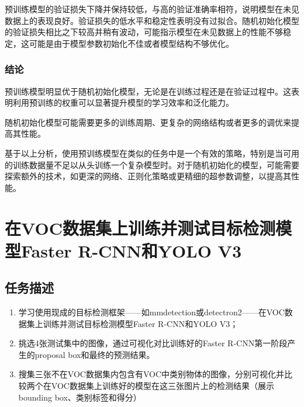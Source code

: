 \documentclass[notitlepage,cs4size,punct,oneside]{ctexrep}
\numberwithin{equation}{chapter}
\theoremstyle{mystyle}
\begin{document}
预训练模型的验证损失下降并保持较低，与高的验证准确率相符，说明模型在未见数据上的表现良好。验证损失的低水平和稳定性表明没有过拟合。随机初始化模型的验证损失相比之下较高并稍有波动，可能指示模型在未见数据上的性能不够稳定，这可能是由于模型参数初始化不佳或者模型结构不够优化。

\subsection{结论}
预训练模型明显优于随机初始化模型，无论是在训练过程还是在验证过程中。这表明利用预训练的权重可以显著提升模型的学习效率和泛化能力。

随机初始化模型可能需要更多的训练周期、更复杂的网络结构或者更多的调优来提高其性能。

基于以上分析，使用预训练模型在类似的任务中是一个有效的策略，特别是当可用的训练数据量不足以从头训练一个复杂模型时。对于随机初始化的模型，可能需要探索额外的技术，如更深的网络、正则化策略或更精细的超参数调整，以提高其性能。



\chapter{在VOC数据集上训练并测试目标检测模型Faster R-CNN和YOLO V3}
\section{任务描述}
\begin{enumerate}
    \item 学习使用现成的目标检测框架——如mmdetection或detectron2——在VOC数据集上训练并测试目标检测模型Faster R-CNN和YOLO V3；
    \item 挑选4张测试集中的图像，通过可视化对比训练好的Faster R-CNN第一阶段产生的proposal box和最终的预测结果。
    \item 搜集三张不在VOC数据集内包含有VOC中类别物体的图像，分别可视化并比较两个在VOC数据集上训练好的模型在这三张图片上的检测结果（展示bounding box、类别标签和得分）
\end{enumerate}
\end{document}
